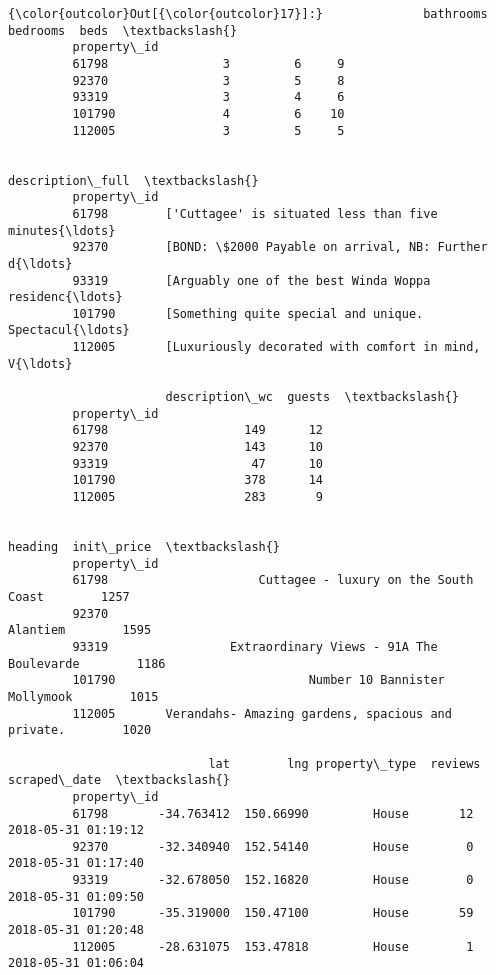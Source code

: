 \documentclass[11pt]{article}
\begin{document}
\begin{Verbatim}[commandchars=\\\{\}]
{\color{outcolor}Out[{\color{outcolor}17}]:}              bathrooms  bedrooms  beds  \textbackslash{}
         property\_id                              
         61798                3         6     9   
         92370                3         5     8   
         93319                3         4     6   
         101790               4         6    10   
         112005               3         5     5   
         
                                                       description\_full  \textbackslash{}
         property\_id                                                      
         61798        ['Cuttagee' is situated less than five minutes{\ldots}   
         92370        [BOND: \$2000 Payable on arrival, NB: Further d{\ldots}   
         93319        [Arguably one of the best Winda Woppa residenc{\ldots}   
         101790       [Something quite special and unique. Spectacul{\ldots}   
         112005       [Luxuriously decorated with comfort in mind, V{\ldots}   
         
                      description\_wc  guests  \textbackslash{}
         property\_id                           
         61798                   149      12   
         92370                   143      10   
         93319                    47      10   
         101790                  378      14   
         112005                  283       9   
         
                                                                heading  init\_price  \textbackslash{}
         property\_id                                                                  
         61798                     Cuttagee - luxury on the South Coast        1257   
         92370                                                 Alantiem        1595   
         93319                 Extraordinary Views - 91A The Boulevarde        1186   
         101790                           Number 10 Bannister Mollymook        1015   
         112005       Verandahs- Amazing gardens, spacious and private.        1020   
         
                            lat        lng property\_type  reviews         scraped\_date  \textbackslash{}
         property\_id                                                                     
         61798       -34.763412  150.66990         House       12  2018-05-31 01:19:12   
         92370       -32.340940  152.54140         House        0  2018-05-31 01:17:40   
         93319       -32.678050  152.16820         House        0  2018-05-31 01:09:50   
         101790      -35.319000  150.47100         House       59  2018-05-31 01:20:48   
         112005      -28.631075  153.47818         House        1  2018-05-31 01:06:04   
         

\end{Verbatim}
\end{document}

